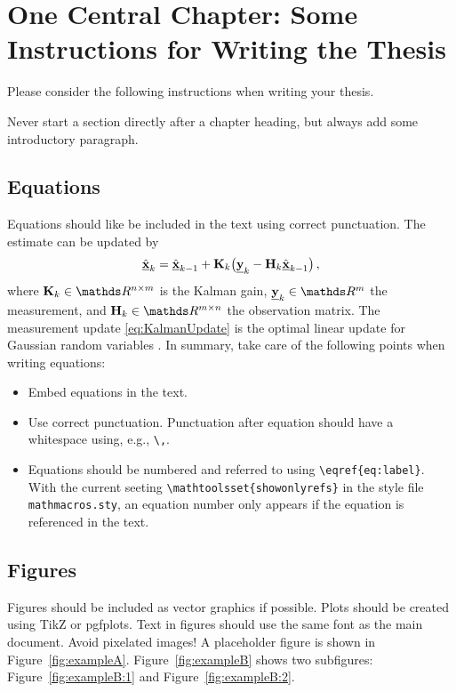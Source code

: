 \documentclass[english,algorithms,reviews,examples,MA]{amsthesis}
\begin{document}
    \chapter{One Central Chapter: Some Instructions for Writing the Thesis}
    Please consider the following instructions when writing your thesis. 
    
    Never start a section directly after a chapter heading, but always add some introductory paragraph.
    
    \section{Equations}

    Equations should like be included in the text using correct punctuation. The estimate can be updated by
    \begin{equation}
        {\ensuremath{\hat{{{\boldsymbol{\mathrm{{\underline{x}}}}}}} }}_{k} = {\hat{{{\boldsymbol{\mathrm{{\underline{x}}}}}}} }_{k-1} + {{\mathbf{K}}}_k \bigl({{\boldsymbol{\mathrm{{\underline{y}}}}}}_k - {{\mathbf{H}}}_k {\hat{{{\boldsymbol{\mathrm{{\underline{x}}}}}}} }_{k-1} \bigr) \, , \label{eq:KalmanUpdate}
    \end{equation}
    where $\mat{K}_k\in\IR^{n\times m}$ is the Kalman gain, $\rvec{y}_k\in\IR^m$ the measurement, and $\mat{H}_k\in\IR^{m\times n}$ the observation matrix. The measurement update \eqref{eq:KalmanUpdate} is the optimal linear update for Gaussian random variables \cite{Anderson1979}.
    In summary, take care of the following points when writing equations:
    \begin{itemize}
    \item Embed equations in the text.
    \item Use correct punctuation. Punctuation after equation should have a whitespace using, e.g., \verb|\,|.
    \item Equations should be numbered and referred to using \verb|\eqref{eq:label}|. With the current seeting \verb|\mathtoolsset{showonlyrefs}| in the style file \verb|mathmacros.sty|, an equation number only appears if the equation is referenced in the text.
    \end{itemize}

    \section{Figures}
    Figures should be included as vector graphics if possible. Plots should be created using TikZ or pgfplots. Text in figures should use the same font as the main document. Avoid pixelated images! A placeholder figure is shown in Figure~\ref{fig:exampleA}. Figure~\ref{fig:exampleB} shows two subfigures: Figure~\ref{fig:exampleB:1} and Figure~\ref{fig:exampleB:2}.
\end{document}
